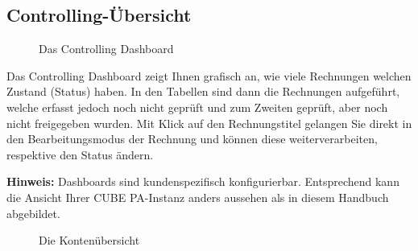 \subsection{Controlling-Übersicht}
\label{bkm:Ref2018080602}

\begin{figure}[H]
\caption{Das Controlling Dashboard}
\end{figure}

Das Controlling Dashboard zeigt Ihnen grafisch an, wie viele Rechnungen welchen Zustand (Status) haben. In den Tabellen sind dann die Rechnungen aufgeführt, welche erfasst jedoch noch nicht geprüft und zum Zweiten geprüft, aber noch nicht freigegeben wurden. Mit Klick auf den Rechnungstitel gelangen Sie direkt in den Bearbeitungsmodus der Rechnung und können diese weiterverarbeiten, respektive den Status ändern.

\vspace{\baselineskip}

\textbf{Hinweis:} Dashboards sind kundenspezifisch konfigurierbar. Entsprechend kann die Ansicht Ihrer CUBE PA-Instanz anders aussehen als in diesem Handbuch abgebildet.

\vspace{\baselineskip}

\begin{figure}[H]
\caption{Die Kontenübersicht}
\end{figure}

